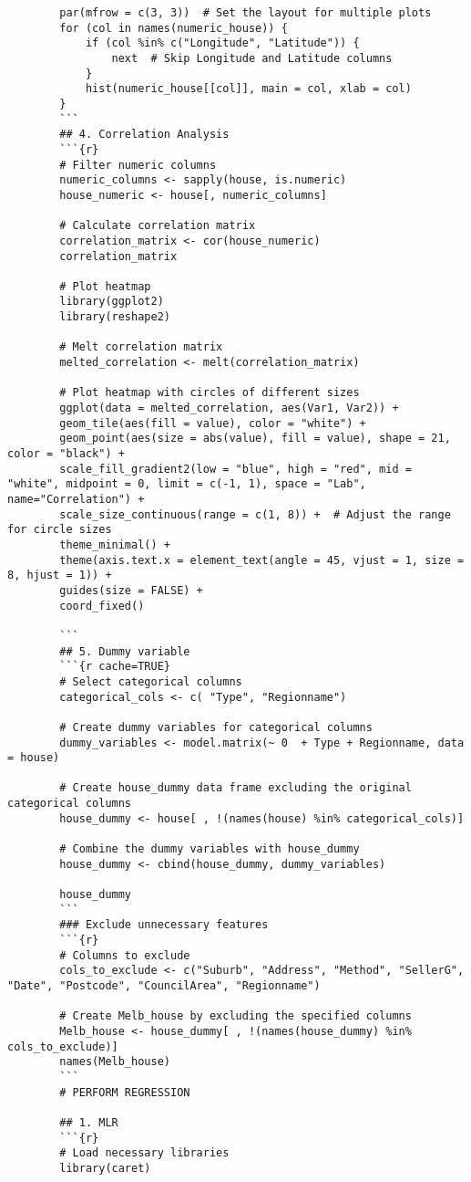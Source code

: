 \documentclass[12pt,doublespace]{article}
\begin{document}
\begin{lstlisting}
		par(mfrow = c(3, 3))  # Set the layout for multiple plots
		for (col in names(numeric_house)) {
			if (col %in% c("Longitude", "Latitude")) {
				next  # Skip Longitude and Latitude columns
			}
			hist(numeric_house[[col]], main = col, xlab = col)
		}
		```
		## 4. Correlation Analysis
		```{r}
		# Filter numeric columns
		numeric_columns <- sapply(house, is.numeric)
		house_numeric <- house[, numeric_columns]
		
		# Calculate correlation matrix
		correlation_matrix <- cor(house_numeric)
		correlation_matrix
		
		# Plot heatmap
		library(ggplot2)
		library(reshape2)
		
		# Melt correlation matrix
		melted_correlation <- melt(correlation_matrix)
		
		# Plot heatmap with circles of different sizes
		ggplot(data = melted_correlation, aes(Var1, Var2)) +
		geom_tile(aes(fill = value), color = "white") +
		geom_point(aes(size = abs(value), fill = value), shape = 21, color = "black") +
		scale_fill_gradient2(low = "blue", high = "red", mid = "white", midpoint = 0, limit = c(-1, 1), space = "Lab", name="Correlation") +
		scale_size_continuous(range = c(1, 8)) +  # Adjust the range for circle sizes
		theme_minimal() +
		theme(axis.text.x = element_text(angle = 45, vjust = 1, size = 8, hjust = 1)) +
		guides(size = FALSE) +
		coord_fixed()
		
		```
		## 5. Dummy variable
		```{r cache=TRUE}
		# Select categorical columns
		categorical_cols <- c( "Type", "Regionname")
		
		# Create dummy variables for categorical columns
		dummy_variables <- model.matrix(~ 0  + Type + Regionname, data = house)
		
		# Create house_dummy data frame excluding the original categorical columns
		house_dummy <- house[ , !(names(house) %in% categorical_cols)]
		
		# Combine the dummy variables with house_dummy
		house_dummy <- cbind(house_dummy, dummy_variables)
		
		house_dummy
		```
		### Exclude unnecessary features
		```{r}
		# Columns to exclude
		cols_to_exclude <- c("Suburb", "Address", "Method", "SellerG", "Date", "Postcode", "CouncilArea", "Regionname")
		
		# Create Melb_house by excluding the specified columns
		Melb_house <- house_dummy[ , !(names(house_dummy) %in% cols_to_exclude)]
		names(Melb_house)
		```
		# PERFORM REGRESSION 
		
		## 1. MLR
		```{r}
		# Load necessary libraries
		library(caret)
		

\end{lstlisting}
\end{document}

